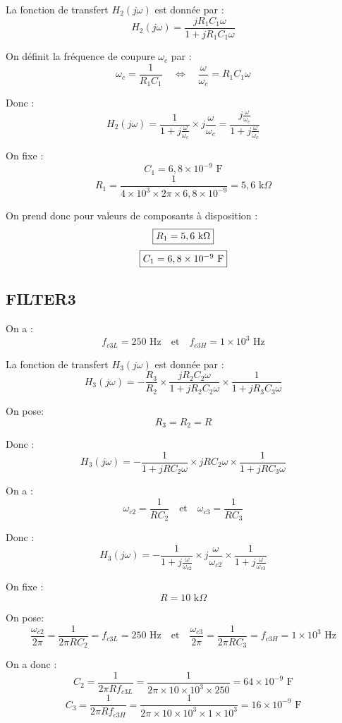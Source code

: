 \documentclass{report}
\begin{document}
La fonction de transfert \( H_2(j\omega) \) est donnée par :
\[
H_2(j\omega) = \frac{j R_1 C_1 \omega}{1 + j R_1 C_1 \omega}
\]

On définit la fréquence de coupure \( \omega_c \) par :
\[
\omega_c = \frac{1}{R_1 C_1} \quad \Leftrightarrow \quad \frac{\omega}{\omega_c} = R_1 C_1 \omega
\]

Donc :
\[
H_2(j\omega) = \frac{1}{1 + j \frac{\omega}{\omega_c}} \times j \frac{\omega}{\omega_c} = \frac{j \frac{\omega}{\omega_c}}{1 + j \frac{\omega}{\omega_c}}
\]

On fixe :
\[
C_1 = 6,8 \times 10^{-9} \text{ F}
\]
\[
R_1 = \frac{1}{4 \times 10^3 \times 2\pi \times 6,8 \times 10^{-9}} = 5,6 \text{ k} \Omega
\]

On prend donc pour valeurs de composants à disposition :
\[
\fbox{$R_1 = 5,6 \text{ k}\Omega$}
\]
\[
\fbox{$C_1 = 6,8 \times 10^{-9} \text{ F}$}
\]

\newpage

\subsection{FILTER3}
On a :
\[f_{c3L} = 250 \text{ Hz} \quad \text{et} \quad f_{c3H} = 1 \times 10^3 \text{ Hz}
\] 

La fonction de transfert \( H_3(j\omega) \) est donnée par :
\[H_3(j\omega) = -\frac{R_3}{R_2} \times \frac{j R_2 C_2 \omega}{1 + j R_2 C_2 \omega} \times \frac{1}{1 + j R_3 C_3 \omega}
\]

On pose: 
\[R_3 = R_2 = R
\]

Donc :
\[H_3(j\omega) = -\frac{1}{1 + j R C_2 \omega} \times j R C_2 \omega \times \frac{1}{1 + j R C_3 \omega}
\]

On a : 
\[\omega_{c2} = \frac{1}{R C_2} \quad \text{et} \quad \omega_{c3} = \frac{1}{R C_3}\]

Donc :
\[H_3(j\omega) = -\frac{1}{1 + j \frac{\omega}{\omega_{c2}}} \times j \frac{\omega}{\omega_{c2}} \times \frac{1}{1 + j \frac{\omega}{\omega_{c3}}}
\]

On fixe :
\[R = 10 \text{ k}\Omega
\]

On pose: 
\[\frac{\omega_{c2}}{2\pi} = \frac{1}{2\pi R C_2} = f_{c3L} = 250 \text{ Hz}
 \quad \text{et} \quad \frac{\omega_{c3}}{2\pi} = \frac{1}{2\pi R C_3} = f_{c3H} = 1 \times 10^3 \text{ Hz}
\]

On a donc :
\[C_2 = \frac{1}{2\pi R f_{c3L}} = \frac{1}{2\pi \times 10 \times 10^3 \times 250} = 64 \times 10^{-9} \text{ F}
\]
\[C_3 = \frac{1}{2\pi R f_{c3H}} = \frac{1}{2\pi \times 10 \times 10^3 \times 1 \times 10^3} = 16 \times 10^{-9} \text{ F}
\]
\end{document}

